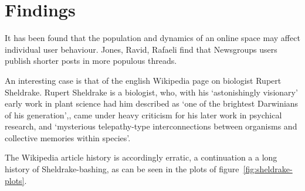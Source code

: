\section{Findings}
It has been found that the population and dynamics of an online space
may affect individual user behaviour. Jones, Ravid, Rafaeli find that
Newsgroups users publish shorter posts in more populous threads.  

An interesting case is that of the english Wikipedia page on biologist
Rupert Sheldrake. Rupert Sheldrake is a biologist, who, with his
`astonishingly visionary' early work in plant science had him
described as `one of the brightest Darwinians of his
generation',\cite{odyssey-auxin}\cite{guardianshel}, came under heavy
criticism for his later work in psychical research, and `mysterious
telepathy-type interconnections between organisms and collective
memories within species'.\cite{sheldrake-biog} 

The Wikipedia article history is accordingly erratic, a continuation a
a long history of Sheldrake-bashing, as can be seen in the plots of
figure~\ref{fig:sheldrake-plots}.

